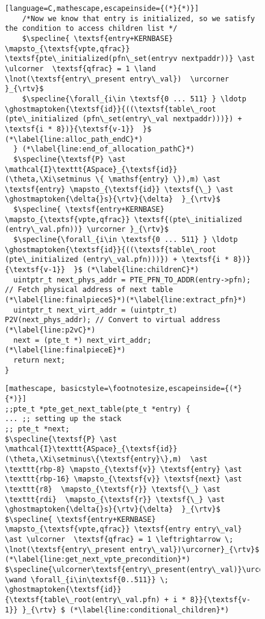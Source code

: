 \begin{figure}
\begin{lstlisting}[language=C,mathescape,escapeinside={(*}{*)}]
    /*Now we know that entry is initialized, so we satisfy the condition to access children list */
    $\specline{ \textsf{entry+KERNBASE} \mapsto_{\textsf{vpte,qfrac}}  \textsf{pte\_initialized(pfn\_set(entryv nextpaddr))} \ast \ulcorner  \textsf{qfrac} = 1 \land \lnot(\textsf{entry\_present entry\_val})  \urcorner }_{\rtv}$
    $\specline{\forall_{i\in \textsf{0 ... 511} } \ldotp  \ghostmaptoken{\textsf{id}}{((\textsf{table\_root (pte\_initialized (pfn\_set(entry\_val nextpaddr)))}) + \textsf{i * 8})}{\textsf{v-1}}  }$ (*\label{line:alloc_path_endC}*)
  } (*\label{line:end_of_allocation_pathC}*)
  $\specline{\textsf{P} \ast \mathcal{I}\texttt{ASpace}_{\textsf{id}}(\theta,\Xi\setminus \{ \mathsf{entry} \}),m) \ast \textsf{entry} \mapsto_{\textsf{id}} \textsf{\_} \ast \ghostmaptoken{\delta{}s}{\rtv}{\delta}  }_{\rtv}$
  $\specline{ \textsf{entry+KERNBASE} \mapsto_{\textsf{vpte,qfrac}} \textsf{(pte\_initialized (entry\_val.pfn))} \urcorner }_{\rtv}$
  $\specline{\forall_{i\in \textsf{0 ... 511} } \ldotp  \ghostmaptoken{\textsf{id}}{((\textsf{table\_root (pte\_initialized (entry\_val.pfn)))}) + \textsf{i * 8})}{\textsf{v-1}}  }$ (*\label{line:childrenC}*)
  uintptr_t next_phys_addr = PTE_PFN_TO_ADDR(entry->pfn); // Fetch physical address of next table (*\label{line:finalpieceS}*)(*\label{line:extract_pfn}*)
  uintptr_t next_virt_addr = (uintptr_t) P2V(next_phys_addr); // Convert to virtual address (*\label{line:p2vC}*)
  next = (pte_t *) next_virt_addr;(*\label{line:finalpieceE}*)
  return next;
}
\end{lstlisting}
\else
\begin{lstlisting}[mathescape, basicstyle=\footnotesize,escapeinside={(*}{*)}]
;;pte_t *pte_get_next_table(pte_t *entry) {
... ;; setting up the stack
;; pte_t *next;
$\specline{\textsf{P} \ast \mathcal{I}\texttt{ASpace}_{\textsf{id}}(\theta,\Xi\setminus\{\textsf{entry}\},m)  \ast \texttt{rbp-8} \mapsto_{\textsf{v}} \textsf{entry} \ast  \texttt{rbp-16} \mapsto_{\textsf{v}} \textsf{next} \ast \texttt{r8}  \mapsto_{\textsf{r}} \textsf{\_} \ast \texttt{rdi}  \mapsto_{\textsf{r}} \textsf{\_} \ast \ghostmaptoken{\delta{}s}{\rtv}{\delta}  }_{\rtv}$
$\specline{ \textsf{entry+KERNBASE} \mapsto_{\textsf{vpte,qfrac}} \textsf{entry entry\_val} \ast \ulcorner  \textsf{qfrac} = 1 \leftrightarrow \; \lnot(\textsf{entry\_present entry\_val})\urcorner}_{\rtv}$ (*\label{line:get_next_vpte_precondition}*)
$\specline{\ulcorner\textsf{entry\_present(entry\_val)}\urcorner \wand \forall_{i\in\textsf{0..511}} \; \ghostmaptoken{\textsf{id}}{\textsf{table\_root(entry\_val.pfn) + i * 8}}{\textsf{v-1}} }_{\rtv} $ (*\label{line:conditional_children}*)

\end{lstlisting}
\end{figure}
